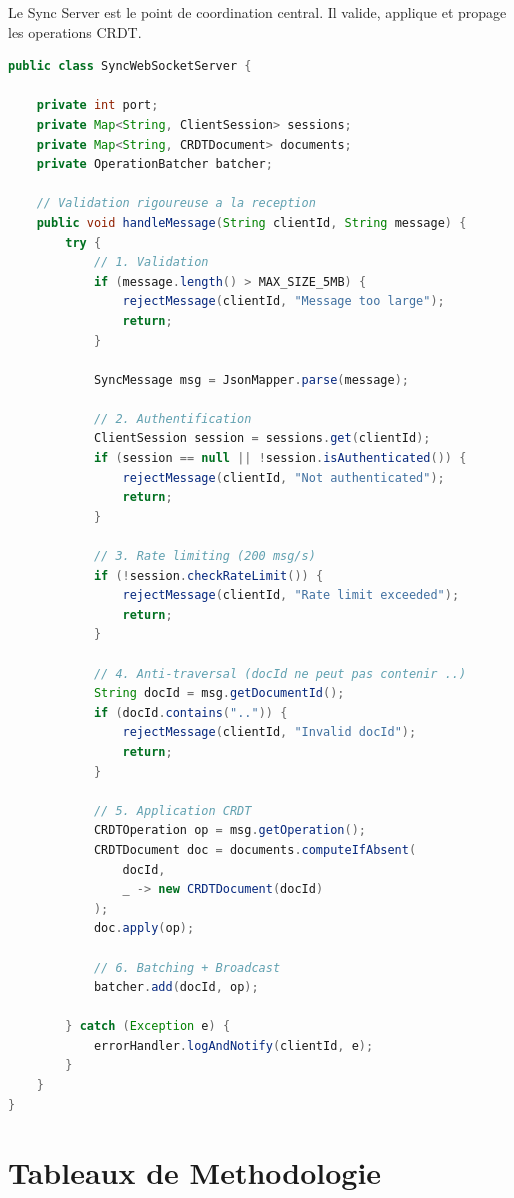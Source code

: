 \documentclass[11pt,a4paper,hidelinks]{book}
\begin{document}
Le Sync Server est le point de coordination central. Il valide, applique et propage les operations CRDT.

\begin{lstlisting}[language=Java, caption={Structure Sync Server}]
public class SyncWebSocketServer {
    
    private int port;
    private Map<String, ClientSession> sessions;
    private Map<String, CRDTDocument> documents;
    private OperationBatcher batcher;
    
    // Validation rigoureuse a la reception
    public void handleMessage(String clientId, String message) {
        try {
            // 1. Validation
            if (message.length() > MAX_SIZE_5MB) {
                rejectMessage(clientId, "Message too large");
                return;
            }
            
            SyncMessage msg = JsonMapper.parse(message);
            
            // 2. Authentification
            ClientSession session = sessions.get(clientId);
            if (session == null || !session.isAuthenticated()) {
                rejectMessage(clientId, "Not authenticated");
                return;
            }
            
            // 3. Rate limiting (200 msg/s)
            if (!session.checkRateLimit()) {
                rejectMessage(clientId, "Rate limit exceeded");
                return;
            }
            
            // 4. Anti-traversal (docId ne peut pas contenir ..)
            String docId = msg.getDocumentId();
            if (docId.contains("..")) {
                rejectMessage(clientId, "Invalid docId");
                return;
            }
            
            // 5. Application CRDT
            CRDTOperation op = msg.getOperation();
            CRDTDocument doc = documents.computeIfAbsent(
                docId,
                _ -> new CRDTDocument(docId)
            );
            doc.apply(op);
            
            // 6. Batching + Broadcast
            batcher.add(docId, op);
            
        } catch (Exception e) {
            errorHandler.logAndNotify(clientId, e);
        }
    }
}
\end{lstlisting}

\section{Tableaux de Methodologie}
\end{document}
